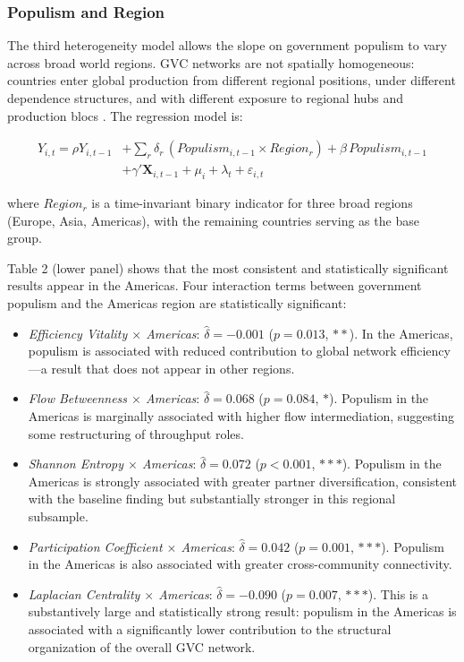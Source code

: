 \documentclass[12pt]{article}
\begin{document}
\subsubsection*{Populism and Region}

The third heterogeneity model allows the slope on government populism to vary across broad world regions. GVC networks are not spatially homogeneous: countries enter global production from different regional positions, under different dependence structures, and with different exposure to regional hubs and production blocs \citep{gereffi2014, coe2015}. The regression model is:

\begin{equation}
\label{eq:region}
\begin{split}
Y_{i,t} = \rho Y_{i,t-1}
  &+ \sum_{r} \delta_r \, (Populism_{i,t-1} \times Region_r) + \beta \, Populism_{i,t-1} \\
  &+ \gamma' \mathbf{X}_{i,t-1} + \mu_i + \lambda_t + \varepsilon_{i,t}
\end{split}
\end{equation}

where $Region_r$ is a time-invariant binary indicator for three broad regions (Europe, Asia, Americas), with the remaining countries serving as the base group.

Table 2 (lower panel) shows that the most consistent and statistically significant results appear in the Americas. Four interaction terms between government populism and the Americas region are statistically significant:

\begin{itemize}
  \item \textit{Efficiency Vitality $\times$ Americas}: $\hat{\delta} = -0.001$ ($p = 0.013$, $**$). In the Americas, populism is associated with reduced contribution to global network efficiency---a result that does not appear in other regions.

  \item \textit{Flow Betweenness $\times$ Americas}: $\hat{\delta} = 0.068$ ($p = 0.084$, $*$). Populism in the Americas is marginally associated with higher flow intermediation, suggesting some restructuring of throughput roles.

  \item \textit{Shannon Entropy $\times$ Americas}: $\hat{\delta} = 0.072$ ($p < 0.001$, $***$). Populism in the Americas is strongly associated with greater partner diversification, consistent with the baseline finding but substantially stronger in this regional subsample.

  \item \textit{Participation Coefficient $\times$ Americas}: $\hat{\delta} = 0.042$ ($p = 0.001$, $***$). Populism in the Americas is also associated with greater cross-community connectivity.

  \item \textit{Laplacian Centrality $\times$ Americas}: $\hat{\delta} = -0.090$ ($p = 0.007$, $***$). This is a substantively large and statistically strong result: populism in the Americas is associated with a significantly lower contribution to the structural organization of the overall GVC network.
\end{itemize}
\end{document}
